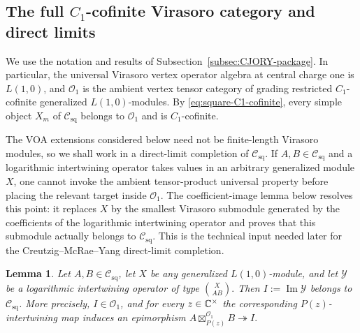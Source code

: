 \documentclass[10pt,a4paper]{amsart}
\numberwithin{equation}{section} \newtheorem{thm}{Theorem}[section] \newtheorem{lem}[thm]{Lemma} \newtheorem{ex}[thm]{Example} \newtheorem{prop}[thm]{Proposition} \newtheorem{cor}[thm]{Corollary} \newtheorem{defi}[thm]{Definition} \newtheorem{rmk}[thm]{Remark} \newtheorem{notation}[thm]{Notation}
\newcommand{\Csq}{\mathcal C_{\mathrm{sq}}}
\newcommand{\Ovir}{\mathcal O_1}
\begin{document}
\subsection{The full \texorpdfstring{$C_1$}{C1}-cofinite Virasoro category and direct limits}

We use the notation and results of Subsection~\ref{subsec:CJORY-package}. In particular, the universal Virasoro vertex operator algebra at central charge one is $L(1,0)$, and $\Ovir$ is the ambient vertex tensor category of grading restricted $C_1$-cofinite generalized $L(1,0)$-modules. By \eqref{eq:square-C1-cofinite}, every simple object $X_m$ of $\Csq$ belongs to $\Ovir$ and is $C_1$-cofinite.

The VOA extensions considered below need not be finite-length Virasoro modules, so we shall work in a direct-limit completion of $\Csq$. If $A,B\in\Csq$ and a logarithmic intertwining operator takes values in an arbitrary generalized module $X$, one cannot invoke the ambient tensor-product universal property before placing the relevant target inside $\Ovir$. The coefficient-image lemma below resolves this point: it replaces $X$ by the smallest Virasoro submodule generated by the coefficients of the logarithmic intertwining operator and proves that this submodule actually belongs to $\Csq$. This is the technical input needed later for the Creutzig--McRae--Yang direct-limit completion.

\begin{lem}\label{lem:coeff-image}
Let $A,B\in\Csq$, let $X$ be any generalized $L(1,0)$-module, and let $\mathcal Y$ be a logarithmic intertwining operator of type \(\binom{X}{A B}.\) Then \(I:=\operatorname{Im}\mathcal Y\) belongs to $\Csq$. More precisely, $I\in\Ovir$, and for every $z\in\mathbb{C}^\times$ the corresponding $P(z)$-intertwining map induces an epimorphism \(A\boxtimes^{\Ovir}_{P(z)}B\twoheadrightarrow I.\)
\end{lem}
\end{document}
